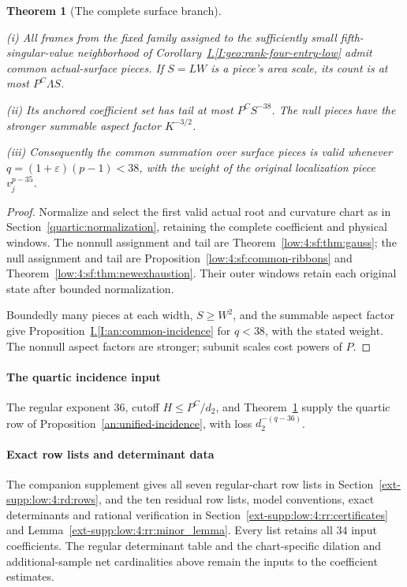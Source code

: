 \documentclass[11pt]{amsart}
\newtheorem{theorem}{Theorem}[section]
\theoremstyle{definition}
\theoremstyle{remark}
\numberwithin{equation}{section}
\newcommand{\partIref}[1]{\hyperref[I:#1]{I.\ref*{I:#1}}}
\begin{document}
\begin{theorem}[The complete surface branch]\label{low:4:sf:surface-completion}

\noindent\textup{(i)} All frames from the fixed family assigned to the sufficiently small fifth-singular-value neighborhood of Corollary~\partIref{geo:rank-four-entry-low} admit common actual-surface pieces. If $S=LW$ is a piece's area scale, its count is at most $P^C\Lambda S$.

\noindent\textup{(ii)} Its anchored coefficient set has tail at most $P^CS^{-38}$. The null pieces have the stronger summable aspect factor $K^{-3/2}$.

\noindent\textup{(iii)} Consequently the common summation over surface pieces is valid whenever $q=(1+\varepsilon)(p-1)<38$, with the weight of the original localization piece $v_j^{p-35}$.
\end{theorem}
\begin{proof}
Normalize and select the first valid actual root and curvature chart as in Section~\ref{quartic:normalization}, retaining the complete coefficient and physical windows. The nonnull assignment and tail are Theorem~\ref{low:4:sf:thm:gauss}; the null assignment and tail are Proposition~\ref{low:4:sf:common-ribbons} and Theorem~\ref{low:4:sf:thm:newexhaustion}. Their outer windows retain each original state after bounded normalization.

Boundedly many pieces at each width, $S\ge W^2$, and the summable aspect factor give Proposition~\partIref{an:common-incidence} for $q<38$, with the stated weight. The nonnull aspect factors are stronger; subunit scales cost powers of $P$.
\end{proof}

\paragraph{The quartic incidence input}\label{quartic:assembly}\label{low:4:ga:section}
The regular exponent $36$, cutoff $H\le P^C/d_2$, and Theorem~\ref{low:4:sf:surface-completion} supply the quartic row of Proposition~\ref{an:unified-incidence}, with loss $d_2^{-(q-36)}$.

\paragraph{Exact row lists and determinant data}
The companion supplement gives all seven regular-chart row lists in Section~\ref{ext-supp:low:4:rd:rows}, and the ten residual row lists, model conventions, exact determinants and rational verification in Section~\ref{ext-supp:low:4:rr:certificates} and Lemma~\ref{ext-supp:low:4:rr:minor_lemma}. Every list retains all $34$ input coefficients. The regular determinant table and the chart-specific dilation and additional-sample net cardinalities above remain the inputs to the coefficient estimates.
\end{document}
